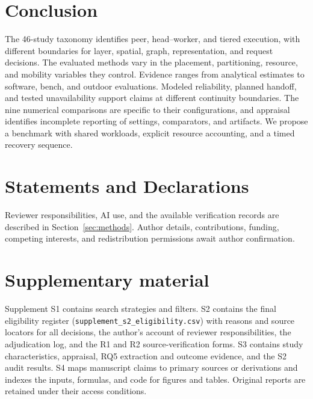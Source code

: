 \documentclass[pdflatex,sn-vancouver-num]{sn-jnl}
\begin{document}
\section{Conclusion}\label{sec:conclusion}
The 46-study taxonomy identifies peer, head--worker, and tiered execution, with different boundaries for layer, spatial, graph, representation, and request decisions. The evaluated methods vary in the placement, partitioning, resource, and mobility variables they control. Evidence ranges from analytical estimates to software, bench, and outdoor evaluations. Modeled reliability, planned handoff, and tested unavailability support claims at different continuity boundaries. The nine numerical comparisons are specific to their configurations, and appraisal identifies incomplete reporting of settings, comparators, and artifacts. We propose a benchmark with shared workloads, explicit resource accounting, and a timed recovery sequence.

\section*{Statements and Declarations}
Reviewer responsibilities, AI use, and the available verification records are described in Section~\ref{sec:methods}. Author details, contributions, funding, competing interests, and redistribution permissions await author confirmation.

\section*{Supplementary material}
Supplement S1 contains search strategies and filters. S2 contains the final eligibility register (\nolinkurl{supplement_s2_eligibility.csv}) with reasons and source locators for all decisions, the author's account of reviewer responsibilities, the adjudication log, and the R1 and R2 source-verification forms. S3 contains study characteristics, appraisal, RQ5 extraction and outcome evidence, and the S2 audit results. S4 maps manuscript claims to primary sources or derivations and indexes the inputs, formulas, and code for figures and tables. Original reports are retained under their access conditions.


\end{document}
